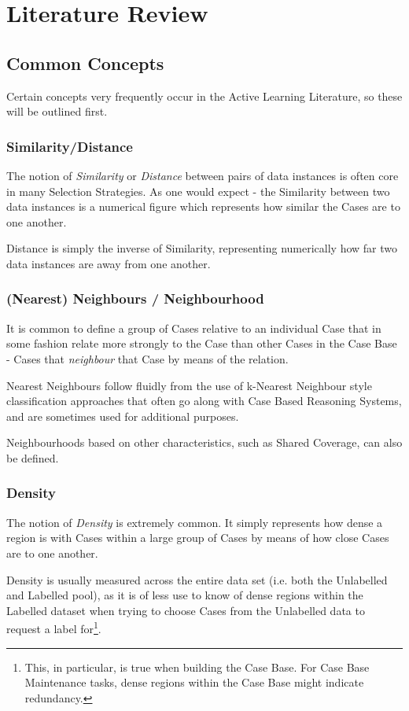 \documentclass[a4paper,11pt]{report}
\begin{document}
\chapter{Literature Review\label{cha:litreview}}

\section{Common Concepts}
Certain concepts very frequently occur in the Active Learning Literature, so these will be outlined first.

\subsection{Similarity/Distance}
The notion of \emph{Similarity} or \emph{Distance} between pairs of data instances is often core in many Selection Strategies. As one would expect - the Similarity between two data instances is a numerical figure which represents how similar the Cases are to one another.

Distance is simply the inverse of Similarity, representing numerically how far two data instances are away from one another.

\subsection{(Nearest) Neighbours / Neighbourhood}
It is common to define a group of Cases relative to an individual Case that in some fashion relate more strongly to the Case than other Cases in the Case Base - Cases that \emph{neighbour} that Case by means of the relation.

Nearest Neighbours follow fluidly from the use of k-Nearest Neighbour style classification approaches that often go along with Case Based Reasoning Systems, and are sometimes used for additional purposes.

Neighbourhoods based on other characteristics, such as Shared Coverage, can also be defined.

\subsection{Density}
The notion of \emph{Density} is extremely common. It simply represents how dense a region is with Cases within a large group of Cases by means of how close Cases are to one another.

Density is usually measured across the entire data set (i.e. both the Unlabelled and Labelled pool), as it is of less use to know of dense regions within the Labelled dataset when trying to choose Cases from the Unlabelled data to request a label for\footnote{This, in particular, is true when building the Case Base. For Case Base Maintenance tasks, dense regions within the Case Base might indicate redundancy.}. 
\end{document}
